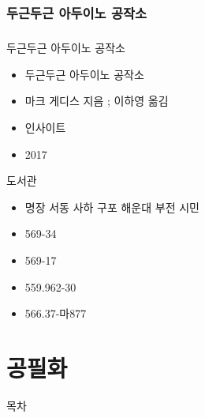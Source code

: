 \documentclass[aspectratio=1610,17pt,xcolor=pdftex,dvipsnames,table,handout]{beamer}
\begin{document}
		\section{ 두근두근 아두이노 공작소 }
		\begin{frame} [t,plain]
		\frametitle{}

			\begin{block} { 두근두근 아두이노 공작소 }
			\setlength{\leftmargini}{4em}			
			\begin{itemize}
				\item [제목]  	두근두근 아두이노 공작소 
				\item [지은이]	마크 게디스 지음 ; 이하영 옮김
				\item [출판사]	인사이트
				\item [출판일]	2017
  			\end{itemize}
			\end{block}						
								
			\begin{block} {도서관}
			\setlength{\leftmargini}{4em}			
			\begin{itemize}
				\item [도서관] 	명장 서동 사하 구포 해운대 부전 시민
				\item [중앙]		569-34
				\item [수정]		569-17
				\item [구덕]		559.962-30
				\item [남구]		566.37-마877
  			\end{itemize}
			\end{block}						

		\end{frame}						


		\part{ 공필화 }
		\frame{\partpage}
		
		\begin{frame} [plain]{목차}
		\tableofcontents%
		\end{frame}


\end{document}
